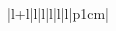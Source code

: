 \documentclass[10pt,a4paper]{article}  %
\begin{document}
\begin{table}[!ht]
\begin{minipage}{\textwidth}
\begin{adjustwidth}{-1.25in}{0in}
\begin{tabular}{|l+l|l|l|l|l|l|p{1cm}|}

\end{tabular}
\end{adjustwidth}
\end{minipage}
\end{table}
\end{document}
